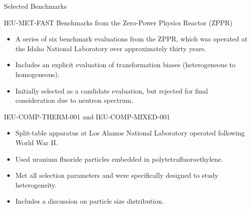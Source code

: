 \documentclass[10pt,aspectratio=169]{beamer}              %
\begin{document}
\begin{frame}{Selected Benchmarks}
    \begin{block}{IEU-MET-FAST Benchmarks from the Zero-Power Physics Reactor (ZPPR)}
        \begin{itemize}
            \item A series of six benchmark evaluations from the ZPPR, which was operated at the Idaho National Laboratory over approximately thirty years.
            \item Includes an explicit evaluation of transformation biases (heterogeneous to homogeneous).
            \item Initially selected as a candidate evaluation, but rejected for final consideration due to neutron spectrum.
        \end{itemize}
    \end{block}
    \begin{block}{IEU-COMP-THERM-001 and IEU-COMP-MIXED-001}
        \begin{itemize}
            \item Split-table apparatus at Los Alamos National Laboratory operated following World War II.
            \item Used uranium fluoride particles embedded in polytetrafluoroethylene.
            \item Met all selection parameters and were specifically designed to study heterogeneity.
            \item Includes a discussion on particle size distribution.
        \end{itemize}
    \end{block}
\end{frame}
\end{document}
